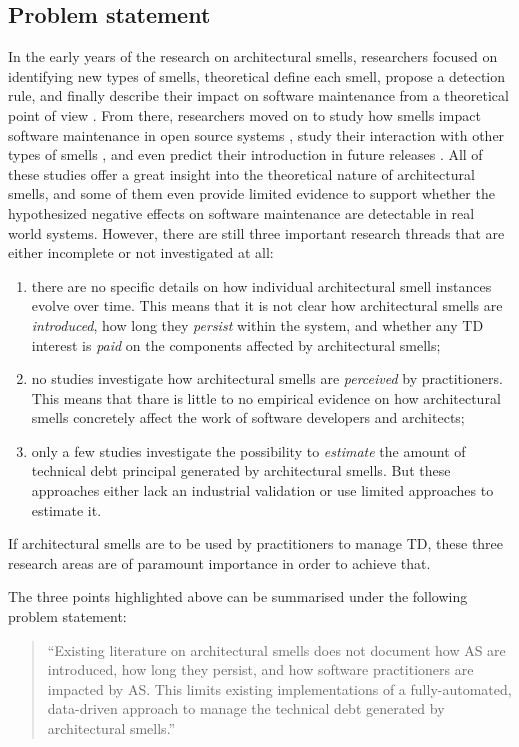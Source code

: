 \subsection{Problem statement}
In the early years of the research on architectural smells, researchers focused on identifying new types of smells, theoretical define each smell, propose a detection rule, and finally describe their impact on software maintenance from a theoretical point of view \cite{Lippert2006,Garcia2009,Mo2015,Le2016,Arcelli2016}.
From there, researchers moved on to study how smells impact software maintenance in open source systems \cite{Choudhary2016,Xiao2016,Le2018}, study their interaction with other types of smells \cite{Sharma2017,Arcelli2019}, and even predict their introduction in future releases \cite{Arcelli2019b}.
All of these studies offer a great insight into the theoretical nature of architectural smells, and some of them even provide limited evidence to support whether the hypothesized negative effects on software maintenance are detectable in real world systems.
However, there are still three important research threads that are either incomplete or not investigated at all:
\begin{enumerate}
    \item there are no specific details on how individual architectural smell instances evolve over time. This means that it is not clear how architectural smells are \emph{introduced}, how long they \emph{persist} within the system, and whether any TD interest is \emph{paid} on the components affected by architectural smells; 
    \item no studies investigate how architectural smells are \emph{perceived} by practitioners. This means that thare is little to no empirical evidence on how architectural smells concretely affect the work of software developers and architects;
    \item only a few studies investigate the possibility to \emph{estimate} the amount of technical debt principal generated by architectural smells. But these approaches either lack an industrial validation or use limited approaches to estimate it. 
\end{enumerate}
If architectural smells are to be used by practitioners to manage TD, these three research areas are of paramount importance in order to achieve that.

The three points highlighted above can be summarised under the following problem statement:
\begin{quote}
    ``Existing literature on architectural smells does not document how AS are introduced, how long they persist, and how software practitioners are impacted by AS. 
    This limits existing implementations of a fully-automated, data-driven approach to manage the technical debt generated by architectural smells.''
\end{quote}

